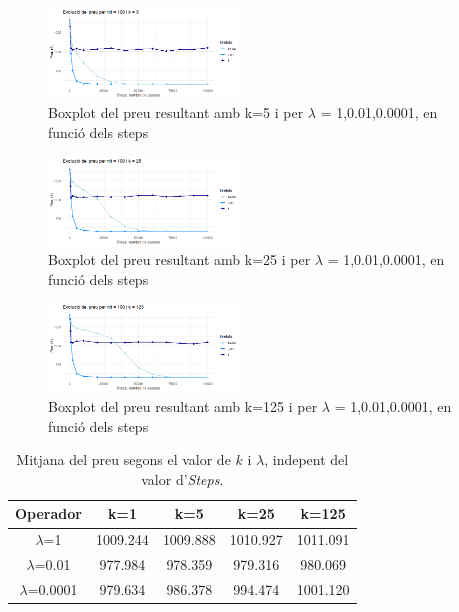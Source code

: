 \documentclass[a4paper]{article}
\begin{document}
	\begin{figure}[H]
		\centering
		\includegraphics[width=0.45\textwidth]{images/exp3_k5.png}
		\caption{Boxplot del preu resultant amb k=5 i per $\lambda$ = {1,0.01,0.0001}, en funció dels steps}
		\label{fig:exp3_k5}
	\end{figure}
	
	\begin{figure}[H]
		\centering
		\includegraphics[width=0.45\textwidth]{images/exp3_k25.png}
		\caption{Boxplot del preu resultant amb k=25 i per $\lambda$ = {1,0.01,0.0001}, en funció dels steps}
		\label{fig:exp3_k25}
	\end{figure}
	
	\begin{figure}[H]
		\centering
		\includegraphics[width=0.45\textwidth]{images/exp3_k125.png}
		\caption{Boxplot del preu resultant amb k=125 i per $\lambda$ = {1,0.01,0.0001}, en funció dels steps}
		\label{fig:exp3_k125}
	\end{figure}
	
	\begin{table}[H]
		\centering
		\begin{tabular}{|c|c|c|c|c|}
			\hline
			\textbf{Operador} & \textbf{k=1} & \textbf{k=5} & \textbf{k=25} & \textbf{k=125} \\
			\hline
			$\lambda$=1 & 1009.244 & 1009.888 & 1010.927 & 1011.091 \\
			\hline
			$\lambda$=0.01 & 977.984 & 978.359 & 979.316 & 980.069 \\
			\hline
			$\lambda$=0.0001 & 979.634 & 986.378 & 994.474 & 1001.120 \\
			\hline
		\end{tabular}
		\caption{Mitjana del preu segons el valor de $k$ i $\lambda$, indepent del valor d'\textit{Steps}.}
		\label{tab:exp3_estadisticas}
	\end{table}
\end{document}
